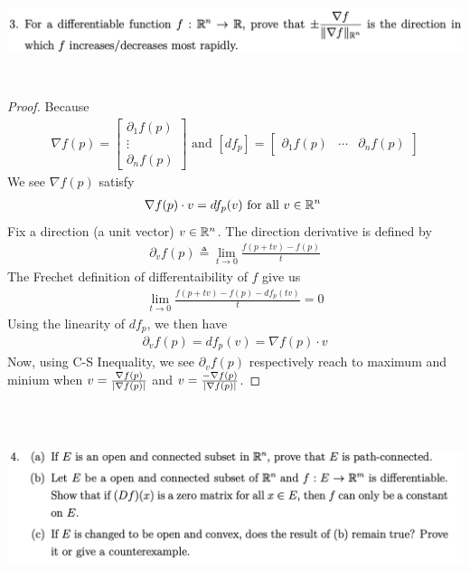 \documentclass{report}
\begin{document}
\begin{question}{}{}
\includegraphics[height=3cm,width=18cm]{ahw5q3}
\end{question}
\begin{proof}
Because 
 \begin{align*}
\nabla f(p)=\begin{bmatrix}
  \partial _1 f(p)\\
   \vdots \\
   \partial _n f(p)
   \end{bmatrix}\text{ and }[df_p]=\begin{bmatrix} \partial_1 f(p)& \cdots  & \partial_n f(p)
\end{bmatrix}
\end{align*}
We see $\nabla f(p)$ satisfy 
\begin{align*}
\nabla f(p)\cdot v= df_p(v)\text{ for all $v\in\mathbb{R}^n$ }
\end{align*}
Fix a direction (a unit vector) $v\in\mathbb{R}^n$. The direction derivative is defined by
\begin{align*}
\partial_v f(p)\triangleq \lim_{t\to 0} \frac{f(p+tv)-f(p)}{t}
\end{align*}
The Frechet definition of differentaibility of $f$ give us 
\begin{align*}
\lim_{t\to 0} \frac{f(p+tv)-f(p)-df_p(tv)}{t}=0
\end{align*}
Using the linearity of $df_p$, we then have 
 \begin{align*}
\partial_v f(p)=df_p(v)=\nabla f(p)\cdot v
\end{align*}
Now, using C-S Inequality, we see $\partial _v f(p)$ respectively reach to maximum and minium when $v= \frac{\nabla f(p)}{\left|\nabla f(p)\right|}$ and $v=\frac{-\nabla f(p)}{\left|\nabla f(p)\right|}$. 
\end{proof}
\begin{question}{}{}
\includegraphics[height=6cm,width=18cm]{ahw5q4}
\end{question}
\end{document}
